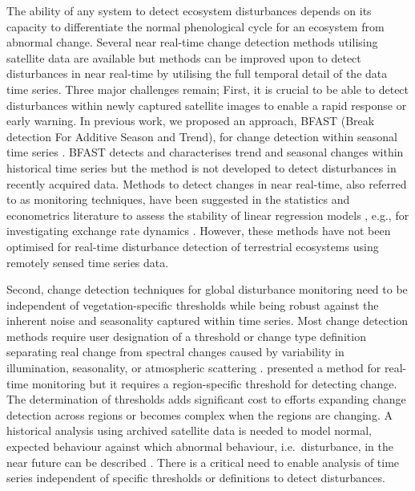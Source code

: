 \documentclass[authoryear,preprint,review,10pt]{elsarticle}
\begin{document}
The ability of any system to detect ecosystem disturbances depends on its capacity to differentiate the normal phenological cycle for an ecosystem from abnormal change. Several near real-time change detection methods utilising satellite data are available \citep{Jiang:2010ko, Verdin:2005by, White2006} but methods can be improved upon to detect disturbances in near real-time by utilising the full temporal detail of the data time series. Three major challenges remain;
First, it is crucial to be able to detect disturbances within newly captured satellite images to enable a rapid response or early warning. In previous work, we proposed an approach,  BFAST (Break detection For Additive Season and Trend), for change detection within seasonal time series \citep{deJong:wo, Verbesselt2009a,Verbesselt:2010wo}.
BFAST detects and characterises trend and seasonal changes within historical time series but the method is not developed to detect disturbances in recently acquired data. Methods to detect changes in near real-time, also referred to as monitoring techniques, have been suggested in the statistics and econometrics literature to assess the stability of linear regression models \citep{Chu1996}, e.g., for investigating exchange rate dynamics \citep{Zeileis:2010tt}. However, these methods have not been optimised for real-time disturbance detection of terrestrial ecosystems using remotely sensed time series data.

Second, change detection techniques for global disturbance monitoring need to be independent of vegetation-specific thresholds while being robust against the inherent noise and seasonality captured within time series.
Most change detection methods require user designation of a threshold or change type definition separating real change from spectral changes caused by variability in illumination, seasonality, or atmospheric scattering \citep{Lu2004, Potter2003, Hayes2007}.  \citet{White2006} presented a method for real-time monitoring but it requires a region-specific threshold for detecting change. The determination of thresholds adds significant cost to efforts expanding change detection across regions or becomes complex when the regions are changing. A historical analysis using archived satellite data is needed to model normal, expected behaviour against which abnormal behaviour, i.e.\ disturbance, in the near future can be described \citep{Hargrove2009}. There is a critical need to enable analysis of time series independent of specific thresholds or definitions to detect disturbances.
\end{document}

